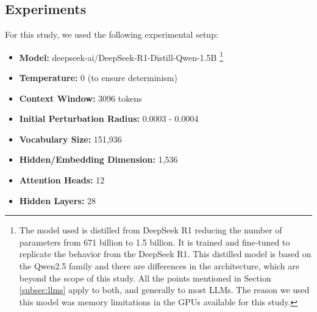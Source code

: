 \documentclass[a4paper,12pt]{article}
\begin{document}







\subsection{Experiments}
\label{subsec:experiments}

For this study, we used the following experimental setup:
\begin{itemize}
    \item \textbf{Model:} deepseek-ai/DeepSeek-R1-Distill-Qwen-1.5B \cite{deepseek2025r1distillqwen1.5b} \footnote{The model used is distilled from DeepSeek R1 reducing the number of parameters from 671 billion to 1.5 billion. It is trained and fine-tuned to replicate the behavior from the DeepSeek R1. This distilled model is based on the Qwen2.5 family and there are differences in the architecture, which are beyond the scope of this study. All the points mentioned in Section \ref{subsec:llms} apply to both, and generally to most LLMs. The reason we used this model was memory limitations in the GPUs available for this study.}
    \item \textbf{Temperature:} 0 (to ensure determinism)
    \item \textbf{Context Window:} 3096 tokens
    \item \textbf{Initial Perturbation Radius:} 0.0003 - 0.0004 %
    \item \textbf{Vocabulary Size:} 151,936
    \item \textbf{Hidden/Embedding Dimension:} 1,536
    \item \textbf{Attention Heads:} 12
    \item \textbf{Hidden Layers:} 28
\end{itemize}
\end{document}
